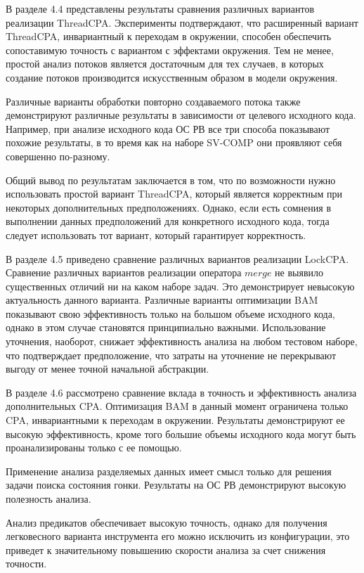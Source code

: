 В разделе 4.4 представлены результаты сравнения различных вариантов реализации ThreadCPA.
Эксперименты подтверждают, что расширенный вариант ThreadCPA, инвариантный к переходам в окружении, способен обеспечить сопоставимую точность с вариантом с эффектами окружения.
Тем не менее, простой анализ потоков является достаточным для тех случаев, в которых создание потоков производится искусственным образом в модели окружения.

Различные варианты обработки повторно создаваемого потока также демонстрируют различные результаты в зависимости от целевого исходного кода.
Например, при анализе исходного кода ОС РВ все три способа показывают похожие результаты, в то время как на наборе SV-COMP они проявляют себя совершенно по-разному. 

Общий вывод по результатам заключается в том, что по возможности нужно использовать простой вариант ThreadCPA, который является корректным при некоторых дополнительных предположениях.
Однако, если есть сомнения в выполнении данных предположений для конкретного исходного кода, тогда следует использовать тот вариант, который гарантирует корректность.

В разделе 4.5 приведено сравнение различных вариантов реализации LockCPA.
Сравнение различных вариантов реализации оператора $merge$ не выявило существенных отличий ни на каком наборе задач.
Это демонстрирует невысокую актуальность данного варианта.
Различные варианты оптимизации BAM показывают свою эффективность только на большом объеме исходного кода, однако в этом случае становятся принципиально важными.
Использование уточнения, наоборот, снижает эффективность анализа на любом тестовом наборе, что подтверждает предположение, что затраты на уточнение не перекрывают выгоду от менее точной начальной абстракции.

В разделе 4.6 рассмотрено сравнение вклада в точность и эффективность анализа дополнительных CPA.
Оптимизация BAM в данный момент ограничена только CPA, инвариантными к переходам в окружении.
Результаты демонстрируют ее высокую эффективность, кроме того большие объемы исходного кода могут быть проанализированы только с ее помощью.

Применение анализа разделяемых данных имеет смысл только для решения задачи поиска состояния гонки.
Результаты на ОС РВ демонстрируют высокую полезность анализа.

Анализ предикатов обеспечивает высокую точность, однако для получения легковесного варианта инструмента его можно исключить из конфигурации, это приведет к значительному повышению скорости анализа за счет снижения точности.


